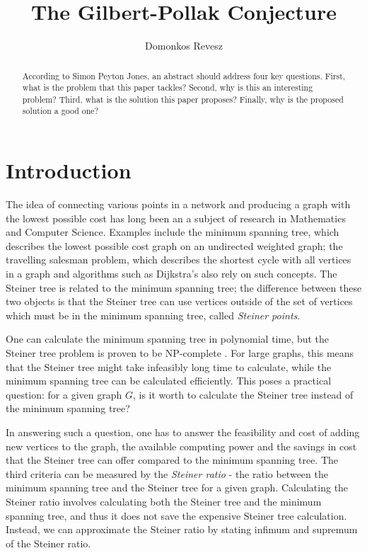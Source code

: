 \documentclass{mpaper}
\begin{document}
\newtheorem{lemma}{Lemma}
\newtheorem{theorem}{Theorem}
\newtheorem{conjecture}{Conjecture}
\theoremstyle{definition}
\newtheorem{definition}{Definition}

\title{The Gilbert-Pollak Conjecture}
\author{Domonkos Revesz}

\maketitle

\begin{abstract}
According to Simon Peyton Jones, an abstract should address
four key questions. First, what is the problem that this
paper tackles? Second, why is this an interesting problem?
Third, what is the solution this paper proposes?
Finally, why is the proposed solution a good one?
\end{abstract}

\section{Introduction}

The idea of connecting various points in a network and producing a graph with the lowest possible cost has long been an a subject of research in Mathematics and Computer Science. Examples include the minimum spanning tree, which describes the lowest possible cost graph on an undirected weighted graph; the travelling salesman problem, which describes the shortest cycle with all vertices in a graph and algorithms such as Dijkstra's also rely on such concepts. The Steiner tree is related to the minimum spanning tree; the difference between these two objects is that the Steiner tree can use vertices outside of the set of vertices which must be in the minimum spanning tree, called \emph{Steiner points}.

One can calculate the minimum spanning tree in polynomial time, but the Steiner tree problem is proven to be NP-complete \cite{Pettie2008}. For large graphs, this means that the Steiner tree might take infeasibly long time to calculate, while the minimum spanning tree can be calculated efficiently. This poses a practical question: for a given graph $G$, is it worth to calculate the Steiner tree instead of the minimum spanning tree?

 In answering such a question, one has to answer the feasibility and cost of adding new vertices to the graph, the available computing power and the savings in cost that the Steiner tree can offer compared to the minimum spanning tree. The third criteria can be measured by the \emph{Steiner ratio} - the ratio between the minimum spanning tree and the Steiner tree for a given graph. Calculating the Steiner ratio involves calculating both the Steiner tree and the minimum spanning tree, and thus it does not save the expensive Steiner tree calculation. Instead, we can approximate the Steiner ratio by stating infimum and supremum of the Steiner ratio.
 
\end{document}
